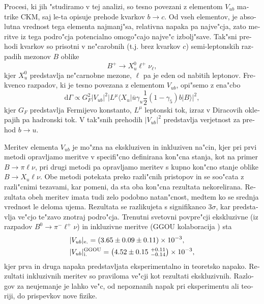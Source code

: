 \begin{otherlanguage}{slovene}
Procesi, ki jih "studiramo v tej analizi, so tesno povezani z elementom $V_{ub}$ matrike CKM, saj le-ta opisuje prehode kvarkov $b \to c$. Od vseh elementov, je absolutna vrednost tega elementa najmanj"sa, relativna napaka pa najve"cja, zato meritve iz tega podro"cja potencialno omogo"cajo najve"c izbolj"save. Tak"sni prehodi kvarkov so prisotni v ne"carobnih (t.j. brez kvarkov $c$) semi-leptonskih razpadih mezonov $B$ oblike 
\begin{equation}
B^+ \to X_u^0 \ell^+ \nu_\ell,
\end{equation}
kjer $X_u^0$ predstavlja ne"carnobne mezone, $\ell$ pa je eden od nabitih leptonov. Frekvenco razpadov, ki je tesno povezana z elementom $V_{ub}$, opi"semo z ena"cbo
\begin{equation}
\mathrm{d} \Gamma \propto G_F^2 \vert V_{ub} \vert ^2 \vert L^\mu \langle X_u \vert \bar u \gamma_u \frac{1}{2} (1-\gamma_5) b \vert B \rangle \vert ^2,
\end{equation}
kjer $G_F$ predstavlja Fermijevo konstanto, $L^\mu$ leptonski tok, izraz v Diracovih oklepajih pa hadronski tok. V tak"snih prehodih $\vert V_{ub} \vert ^2$ predstavlja verjetnost za prehod $b \to u$.

Meritev elementa $V_{ub}$ je mo"zna na ekskluziven in inkluziven na"cin, kjer pri prvi metodi opravljamo meritve v specifi"cno definirana kon"cna stanja, kot na primer $B \to \pi \ell \nu$, pri drugi metodi pa opravljamo meritev s kupno kon"cno stanje oblike $B \to X_u \ell \nu$. Obe metodi potekata preko razli"cnih pristopov in se soo"cata z razli"cnimi tezavami, kar pomeni, da sta oba kon"cna rezultata nekorelirana. Rezultata obeh meritev imata tudi zelo podobno natan"cnost, medtem ko se srednja vrednost le deloma ujema. Rezultata se razlikujeta s signifikanco $3\sigma$, kar predstavlja ve"cjo te"zavo znotraj podro"cja. Trenutni svetovni povpre"cji \cite{Amhis:2016xyh} ekskluzivne (iz razpadov $B^0 \to \pi^- \ell^+ \nu$) in inkluzivne meritve (GGOU kolaboracija \cite{Gambino:2007rp}) sta
\begin{align}
&\vert V_{ub} \vert_{\mathrm{e.}} = \left(3.65 \pm 0.09 \pm 0.11\right)\times 10^{-3},\\
&\vert V_{ub} \vert_{\mathrm{i.}}^{\mathrm{GGOU}} = \left(4.52 \pm 0.15~{}^{+0.11}_{-0.14}\right)\times 10^{-3},
\end{align}
kjer prva in druga napaka predstavljata eksperimentalno in teoretsko napako. Rezultati inkluzivnih meritev so praviloma ve"cji kot rezultati ekskluzivnih. Razlogov za neujemanje je lahko ve"c, od nepoznanih napak pri eksperimentu ali teoriji, do prispevkov nove fizike.


\end{otherlanguage}
